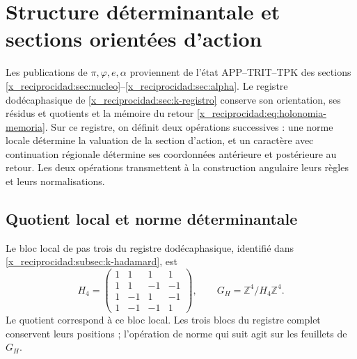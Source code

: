 \section{Structure déterminantale et sections orientées d’action}
\label{x_reciprocidad:iv:action:section}

Les publications de \(\pi,\varphi,e,\alpha\) proviennent de l’état
APP--TRIT--TPK des sections
\ref{x_reciprocidad:sec:nucleo}--\ref{x_reciprocidad:sec:alpha}. Le registre dodécaphasique de
\ref{x_reciprocidad:sec:k-registro} conserve son orientation, ses résidus et
quotients et la mémoire du retour
\eqref{x_reciprocidad:eq:holonomia-memoria}. Sur ce registre, on définit deux opérations
successives : une norme locale détermine la valuation de la section
d’action, et un caractère avec continuation régionale détermine ses
coordonnées antérieure et postérieure au retour. Les deux opérations
transmettent à la construction angulaire leurs règles et leurs normalisations.

\subsection{Quotient local et norme déterminantale}
\label{x_reciprocidad:iv:action:determinantal}

Le bloc local de pas trois du registre dodécaphasique, identifié
dans \ref{x_reciprocidad:subsec:k-hadamard}, est
\begin{equation}
 H_4=\begin{pmatrix}
 1&1&1&1\\
 1&1&-1&-1\\
 1&-1&1&-1\\
 1&-1&-1&1
 \end{pmatrix},
 \qquad G_H=\mathbb Z^4/H_4\mathbb Z^4.
 \label{x_reciprocidad:iv:action:h4}
\end{equation}
Le quotient correspond à ce bloc local. Les trois blocs du
registre complet conservent leurs positions ; l’opération de norme
qui suit agit sur les feuillets de \(G_H\).

